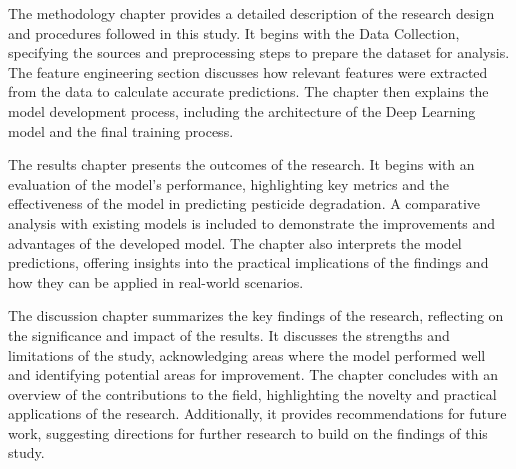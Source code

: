 The methodology chapter provides a detailed description of the research design and procedures followed in this study. It begins with the Data Collection, specifying the sources and preprocessing steps to prepare the dataset for analysis. The feature engineering section discusses how relevant features were extracted from the data to calculate accurate predictions. The chapter then explains the model development process, including the architecture of the Deep Learning model and the final training process.

The results chapter presents the outcomes of the research. It begins with an evaluation of the model's performance, highlighting key metrics and the effectiveness of the model in predicting pesticide degradation. A comparative analysis with existing models is included to demonstrate the improvements and advantages of the developed model. The chapter also interprets the model predictions, offering insights into the practical implications of the findings and how they can be applied in real-world scenarios.

The discussion chapter summarizes the key findings of the research, reflecting on the significance and impact of the results. It discusses the strengths and limitations of the study, acknowledging areas where the model performed well and identifying potential areas for improvement. The chapter concludes with an overview of the contributions to the field, highlighting the novelty and practical applications of the research. Additionally, it provides recommendations for future work, suggesting directions for further research to build on the findings of this study.